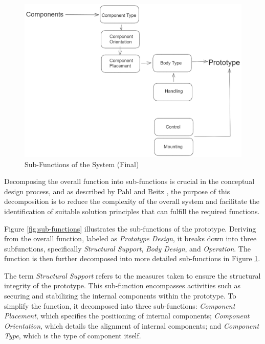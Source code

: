 \begin{figure}[ht!]
    \centering
    \includegraphics[width=\linewidth]{texs/Part1/chapter3/image/subfunction2.png}
    \caption{Sub-Functions of the System (Final)}
    \label{fig:sub-functions-final}
\end{figure}

Decomposing the overall function into sub-functions is crucial in the conceptual design process, and as described by Pahl and Beitz \cite{Pahl07r}, the purpose of this decomposition is to reduce the complexity of the overall system and facilitate the identification of suitable solution principles that can fulfill the required functions.

Figure \ref{fig:sub-functions} illustrates the sub-functions of the prototype. Deriving from the overall function, labeled as \textit{Prototype Design}, it breaks down into three subfunctions, specifically \textit{Structural Support}, \textit{Body Design}, and \textit{Operation}. The function is then further decomposed into more detailed sub-functions in Figure \ref{fig:sub-functions-final}.

The term \textit{Structural Support} refers to the measures taken to ensure the structural integrity of the prototype. This sub-function encompasses activities such as securing and stabilizing the internal components within the prototype. To simplify the function, it decomposed into three sub-functions:  \textit{Component Placement}, which specifies the positioning of internal components; \textit{Component Orientation}, which details the alignment of internal components; and \textit{Component Type}, which is the type of component itself.

